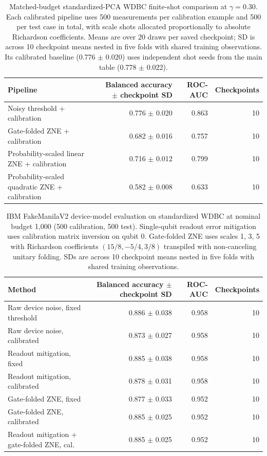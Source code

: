 \documentclass[conference]{IEEEtran}
\begin{document}
\begin{table}[t]\centering\small
\caption{Matched-budget standardized-PCA WDBC finite-shot comparison at $\gamma=0.30$. Each calibrated pipeline uses 500 measurements per calibration example and 500 per test case in total, with scale shots allocated proportionally to absolute Richardson coefficients. Means are over 20 draws per saved checkpoint; SD is across 10 checkpoint means nested in five folds with shared training observations. Its calibrated baseline (0.776 $\pm$ 0.020) uses independent shot seeds from the main table (0.778 $\pm$ 0.022).}
\label{tab:primary-gatefold}
\begin{tabular}{@{}l r r r@{}}\toprule
Pipeline & Balanced accuracy $\pm$ checkpoint SD & ROC-AUC & Checkpoints \\ \midrule
Noisy threshold + calibration & 0.776 $\pm$ 0.020 & 0.863 & 10 \\
Gate-folded ZNE + calibration & 0.682 $\pm$ 0.016 & 0.757 & 10 \\
Probability-scaled linear ZNE + calibration & 0.716 $\pm$ 0.012 & 0.799 & 10 \\
Probability-scaled quadratic ZNE + calibration & 0.582 $\pm$ 0.008 & 0.633 & 10 \\
\bottomrule\end{tabular}\end{table}

\begin{table}[t]\centering\small
\caption{IBM FakeManilaV2 device-model evaluation on standardized WDBC at nominal budget 1,000 (500 calibration, 500 test). Single-qubit readout error mitigation uses calibration matrix inversion on qubit 0. Gate-folded ZNE uses scales 1, 3, 5 with Richardson coefficients $(15/8, -5/4, 3/8)$ transpiled with non-canceling unitary folding. SDs are across 10 checkpoint means nested in five folds with shared training observations.}
\label{tab:fake-backend}
\begin{tabular}{@{}l r r r@{}}\toprule
Method & Balanced accuracy $\pm$ checkpoint SD & ROC-AUC & Checkpoints \\ \midrule
Raw device noise, fixed threshold & 0.886 $\pm$ 0.038 & 0.958 & 10 \\
Raw device noise, calibrated & 0.873 $\pm$ 0.027 & 0.958 & 10 \\
Readout mitigation, fixed & 0.885 $\pm$ 0.038 & 0.958 & 10 \\
Readout mitigation, calibrated & 0.878 $\pm$ 0.031 & 0.958 & 10 \\
Gate-folded ZNE, fixed & 0.877 $\pm$ 0.033 & 0.952 & 10 \\
Gate-folded ZNE, calibrated & 0.885 $\pm$ 0.025 & 0.952 & 10 \\
Readout mitigation + gate-folded ZNE, cal. & 0.885 $\pm$ 0.025 & 0.952 & 10 \\
\bottomrule\end{tabular}\end{table}
\end{document}
